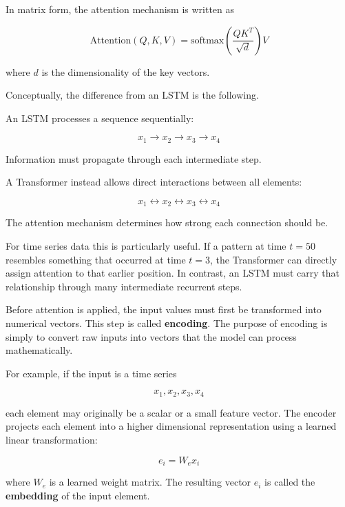\documentclass{book}
\begin{document}
    In matrix form, the attention mechanism is written as
    
    \[
    \text{Attention}(Q,K,V) =
    \text{softmax}\!\left(\frac{QK^T}{\sqrt{d}}\right)V
    \]
    
    where \(d\) is the dimensionality of the key vectors.
    
    Conceptually, the difference from an LSTM is the following.
    
    An LSTM processes a sequence sequentially:
    
    \[
    x_1 \rightarrow x_2 \rightarrow x_3 \rightarrow x_4
    \]
    
    Information must propagate through each intermediate step.
    
    A Transformer instead allows direct interactions between all elements:
    
    \[
    x_1 \leftrightarrow x_2 \leftrightarrow x_3 \leftrightarrow x_4
    \]
    
    The attention mechanism determines how strong each connection should be.
    
    For time series data this is particularly useful. If a pattern at time \(t=50\) resembles something that occurred at time \(t=3\), the Transformer can directly assign attention to that earlier position. In contrast, an LSTM must carry that relationship through many intermediate recurrent steps.



Before attention is applied, the input values must first be transformed into numerical vectors. This step is called \textbf{encoding}. The purpose of encoding is simply to convert raw inputs into vectors that the model can process mathematically.

    For example, if the input is a time series
    
    \[
    x_1, x_2, x_3, x_4
    \]
    
    each element may originally be a scalar or a small feature vector. The encoder projects each element into a higher dimensional representation using a learned linear transformation:
    
    \[
    e_i = W_e x_i
    \]
    
    where \(W_e\) is a learned weight matrix. The resulting vector \(e_i\) is called the \textbf{embedding} of the input element.
    
\end{document}
